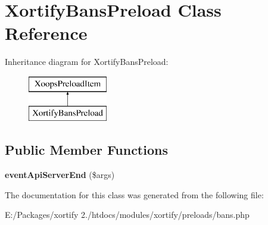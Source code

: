 \hypertarget{class_xortify_bans_preload}{\section{Xortify\-Bans\-Preload Class Reference}
\label{class_xortify_bans_preload}
}
Inheritance diagram for Xortify\-Bans\-Preload\-:\begin{figure}[H]
\begin{center}
\leavevmode
\includegraphics[height=2.000000cm]{class_xortify_bans_preload}
\end{center}
\end{figure}
\subsection*{Public Member Functions}
\begin{DoxyCompactItemize}
\item 
\hypertarget{class_xortify_bans_preload_ae448384a73a28f332e0ef5991bb20337}{{\bfseries event\-Api\-Server\-End} (\$args)}\label{class_xortify_bans_preload_ae448384a73a28f332e0ef5991bb20337}

\end{DoxyCompactItemize}


The documentation for this class was generated from the following file\-:\begin{DoxyCompactItemize}
\item 
E\-:/\-Packages/xortify 2./htdocs/modules/xortify/preloads/bans.\-php\end{DoxyCompactItemize}
